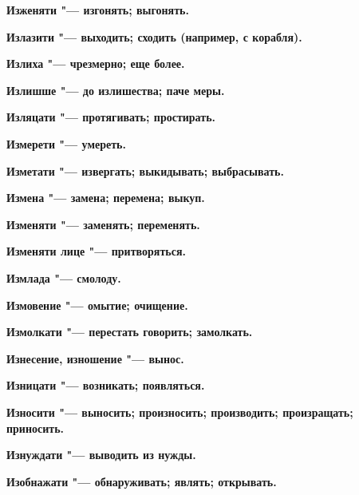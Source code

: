 \begin{multicols}{2}
\bfseries Изженяти\normalfont{} "--- изгонять; выгонять. 




\bfseries Излазити\normalfont{} "--- выходить; сходить (например, с корабля). 




\bfseries Излиха\normalfont{} "--- чрезмерно; еще более. 




\bfseries Излишше\normalfont{} "--- до излишества; паче меры. 




\bfseries Изляцати\normalfont{} "--- протягивать; простирать. 




\bfseries Измерети\normalfont{} "--- умереть. 




\bfseries Изметати\normalfont{} "--- извергать; выкидывать; выбрасывать. 




\bfseries Измена\normalfont{} "--- замена; перемена; выкуп. 




\bfseries Изменяти\normalfont{} "--- заменять; переменять. 




\bfseries Изменяти лице\normalfont{} "--- притворяться. 




\bfseries Измлада\normalfont{} "--- смолоду. 




\bfseries Измовение\normalfont{} "--- омытие; очищение. 




\bfseries Измолкати\normalfont{} "--- перестать говорить; замолкать. 




\bfseries Изнесение, изношение\normalfont{} "--- вынос. 




\bfseries Изницати\normalfont{} "--- возникать; появляться. 




\bfseries Износити\normalfont{} "--- выносить; произносить; производить; произращать; приносить. 




\bfseries Изнуждати\normalfont{} "--- выводить из нужды. 




\bfseries Изобнажати\normalfont{} "--- обнаруживать; являть; открывать. 





\end{multicols}
